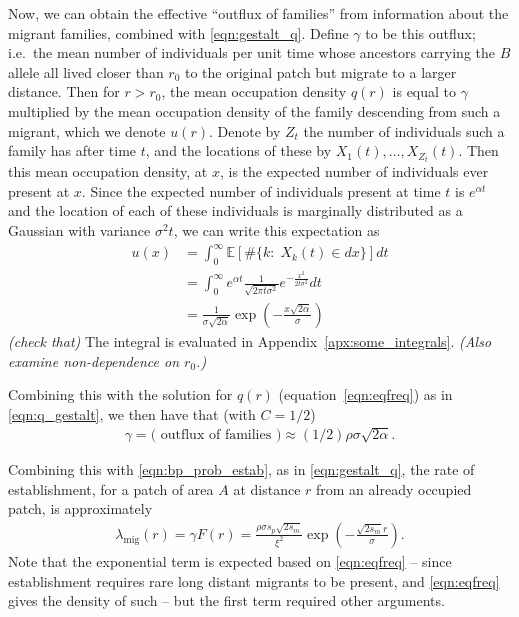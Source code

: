 \documentclass{article}
\newcommand{\E}{\mathbb{E}}
\newcommand{\migrate}{\lambda_\text{mig}}
\newcommand{\plr}[1]{{\it\color{blue}(#1)}}
\begin{document}
Now, we can obtain the effective ``outflux of families'' from information about the migrant families, combined with \eqref{eqn:gestalt_q}.
Define $\gamma$ to be this outflux; 
i.e.\ the mean number of individuals per unit time whose ancestors carrying the $B$ allele all lived closer than $r_0$ to the original patch
but migrate to a larger distance.
Then for $r>r_0$, the mean occupation density $q(r)$ is equal to $\gamma$ 
multiplied by the mean occupation density of the family descending from such a migrant,
which we denote $u(r)$.
Denote by $Z_t$ the number of individuals such a family has after time $t$,
and the locations of these by $X_1(t), \ldots, X_{Z_t}(t)$.
Then this mean occupation density, at $x$, is the expected number of individuals ever present at $x$. 
Since the expected number of individuals present at time $t$ is $e^{\alpha t}$
and the location of each of these individuals is marginally distributed as a  Gaussian with variance $\sigma^2 t$,
we can write this expectation as
\begin{align}
    u(x) &= \int_0^\infty \E[ \#\{ k : \; X_k(t) \in dx \} ] dt \\
    &= \int_0^\infty e^{\alpha t} \frac{1}{\sqrt{2 \pi t \sigma^2}} e^{-\frac{x^2}{2t\sigma^2}} dt \\
    &= \frac{ 1 }{ \sigma \sqrt{2 \alpha} } \exp\left( - \frac{ x \sqrt{2\alpha} }{ \sigma } \right) 
\end{align}
\plr{check that}
The integral is evaluated in Appendix~\ref{apx:some_integrals}.
\plr{Also examine non-dependence on $r_0$.}

Combining this with the solution for $q(r)$ (equation~\eqref{eqn:eqfreq}) as in \eqref{eqn:q_gestalt},
we then have that (with $C=1/2$)
\begin{align} \label{eqn:outflux}
    \gamma = \text{( outflux of families )} \approx (1/2) \rho \sigma \sqrt{2\alpha} .
\end{align}

Combining this with \eqref{eqn:bp_prob_estab}, as in \eqref{eqn:gestalt_q}, 
the rate of establishment, for a patch of area $A$ at distance $r$ from an already occupied patch, is approximately
\begin{align} \label{eqn:migrate}
    \migrate(r) = \gamma F(r) = \frac{\rho \sigma s_p\sqrt{2s_m} }{\xi^2}  \exp\left( -\frac{ \sqrt{2 s_m} r}{\sigma} \right).
\end{align}
Note that the exponential term is expected based on \eqref{eqn:eqfreq} -- 
since establishment requires rare long distant migrants to be present, and \eqref{eqn:eqfreq} gives the density of such --
but the first term required other arguments.
\end{document}
